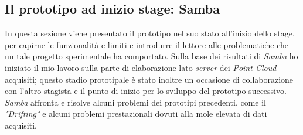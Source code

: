 \subsection{Il prototipo ad inizio stage: Samba}
In questa sezione viene presentato il prototipo nel suo stato all'inizio dello stage, per capirne le funzionalità e limiti e introdurre il lettore alle problematiche che un tale progetto sperimentale ha comportato.
Sulla base dei risultati di \emph{Samba} ho iniziato il mio lavoro sulla parte di elaborazione lato \emph{server} dei \emph{Point Cloud} acquisiti; questo stadio prototipale è stato inoltre un occasione di collaborazione con l'altro stagista e il punto di inizio per lo sviluppo del prototipo successivo.
\noindent
\emph{Samba} affronta e risolve alcuni problemi dei prototipi precedenti, come il \emph{"Drifting"} e alcuni problemi prestazionali dovuti alla mole elevata di dati acquisiti.

